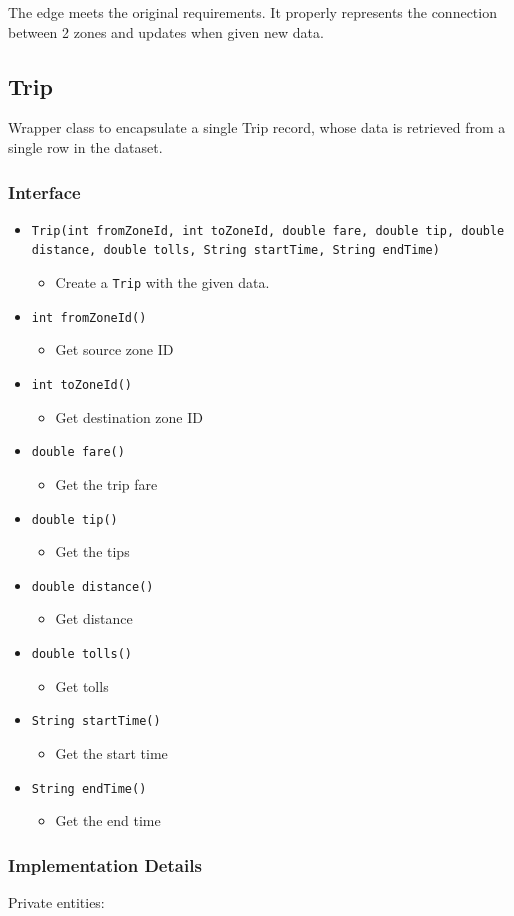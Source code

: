 \documentclass[12pt]{article}
\newcommand{\bi}{\begin{itemize}}
\newcommand{\ei}{\end{itemize}}
\newcommand{\code}[1]{\texttt{#1}}
\begin{document}
The edge meets the original requirements. It properly represents the connection between 2 zones and updates when given new data.

\newpage

\subsection{Trip}

Wrapper class to encapsulate a single Trip record, whose data is retrieved from a single row in the dataset. 

\subsubsection{Interface}

\bi
	\item \code{Trip(int fromZoneId, int toZoneId, double fare, 
			double tip, double distance, double tolls, String startTime, String endTime)}
	\bi
		\item Create a \code{Trip} with the given data.
	\ei
	\item \code{int fromZoneId()}
	\bi
		\item Get source zone ID
	\ei
	\item \code{int toZoneId()}
	\bi
		\item Get destination zone ID
	\ei
	\item \code{double fare()}
	\bi
		\item Get the trip fare
	\ei
	\item \code{double tip()}
	\bi
		\item Get the tips
	\ei
	\item \code{double distance()}
	\bi
		\item Get distance
	\ei
	\item \code{double tolls()}
	\bi
		\item Get tolls
	\ei
	\item \code{String startTime()}
	\bi
		\item Get the start time
	\ei
	\item \code{String endTime()}
	\bi
		\item Get the end time
	\ei
\ei

\subsubsection{Implementation Details}

Private entities:
\end{document}

